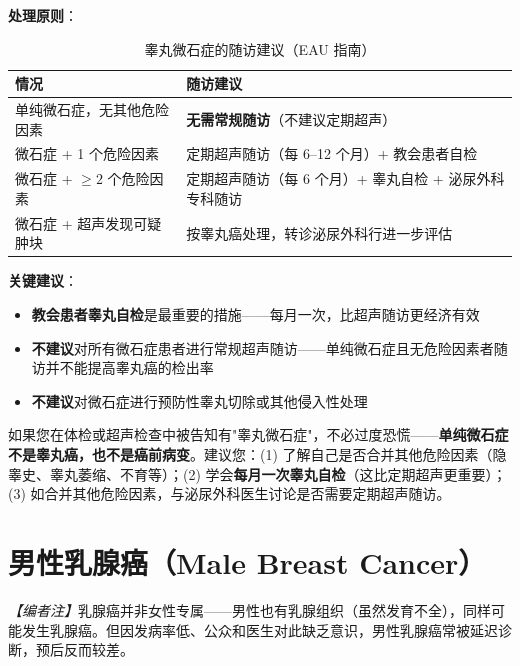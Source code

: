 \documentclass[12pt,a4paper,twoside]{ctexbook}
\begin{document}
\vspace{0.5em}
\noindent\textbf{处理原则}：

\begin{table}[htbp]
\centering
\caption{睾丸微石症的随访建议（EAU 指南）}
\label{tab:microlithiasis_followup}
\begin{tabularx}{\textwidth}{@{}lX@{}}
    \toprule
    \textbf{情况} & \textbf{随访建议} \\
    \midrule
    单纯微石症，无其他危险因素 & \textbf{无需常规随访}（不建议定期超声） \\
    微石症 + 1 个危险因素 & 定期超声随访（每 6--12 个月）+ 教会患者自检 \\
    微石症 + $\geq 2$ 个危险因素 & 定期超声随访（每 6 个月）+ 睾丸自检 + 泌尿外科专科随访 \\
    微石症 + 超声发现可疑肿块 & 按睾丸癌处理，转诊泌尿外科行进一步评估 \\
    \bottomrule
\end{tabularx}
\end{table}

\vspace{0.5em}
\noindent\textbf{关键建议}：
\begin{itemize}[leftmargin=2cm]
	\item \textbf{教会患者睾丸自检}是最重要的措施——每月一次，比超声随访更经济有效
	\item \textbf{不建议}对所有微石症患者进行常规超声随访——单纯微石症且无危险因素者随访并不能提高睾丸癌的检出率
	\item \textbf{不建议}对微石症进行预防性睾丸切除或其他侵入性处理
\end{itemize}

\begin{tcolorbox}[colback=pink!5!white,colframe=red!50!black,title=贴心小叮咛]
如果您在体检或超声检查中被告知有"睾丸微石症"，不必过度恐慌——\textbf{单纯微石症不是睾丸癌，也不是癌前病变}。建议您：(1) 了解自己是否合并其他危险因素（隐睾史、睾丸萎缩、不育等）；(2) 学会\textbf{每月一次睾丸自检}（这比定期超声更重要）；(3) 如合并其他危险因素，与泌尿外科医生讨论是否需要定期超声随访。
\end{tcolorbox}

\section{男性乳腺癌（Male Breast Cancer）}


\label{sec:male_breast_cancer}

\noindent\textit{【编者注】}乳腺癌并非女性专属——男性也有乳腺组织（虽然发育不全），同样可能发生乳腺癌。但因发病率低、公众和医生对此缺乏意识，男性乳腺癌常被延迟诊断，预后反而较差。
\end{document}
